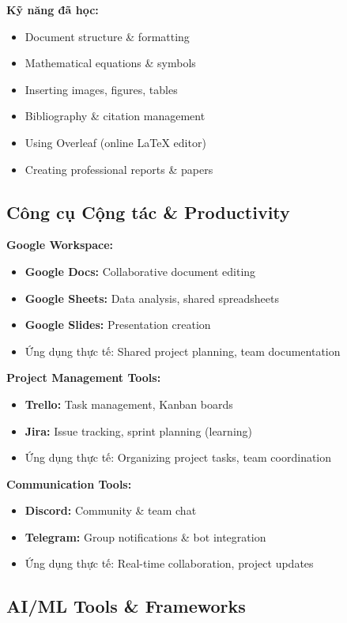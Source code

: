 \documentclass[12pt,a4paper]{article}
\begin{document}
\textbf{Kỹ năng đã học:}
\begin{itemize}
    \item Document structure \& formatting
    \item Mathematical equations \& symbols
    \item Inserting images, figures, tables
    \item Bibliography \& citation management
    \item Using Overleaf (online LaTeX editor)
    \item Creating professional reports \& papers
\end{itemize}

\subsection{Công cụ Cộng tác \& Productivity}

\textbf{Google Workspace:}
\begin{itemize}
    \item \textbf{Google Docs:} Collaborative document editing
    \item \textbf{Google Sheets:} Data analysis, shared spreadsheets
    \item \textbf{Google Slides:} Presentation creation
    \item Ứng dụng thực tế: Shared project planning, team documentation
\end{itemize}

\textbf{Project Management Tools:}
\begin{itemize}
    \item \textbf{Trello:} Task management, Kanban boards
    \item \textbf{Jira:} Issue tracking, sprint planning (learning)
    \item Ứng dụng thực tế: Organizing project tasks, team coordination
\end{itemize}

\textbf{Communication Tools:}
\begin{itemize}
    \item \textbf{Discord:} Community \& team chat
    \item \textbf{Telegram:} Group notifications \& bot integration
    \item Ứng dụng thực tế: Real-time collaboration, project updates
\end{itemize}

\subsection{AI/ML Tools \& Frameworks}
\end{document}
